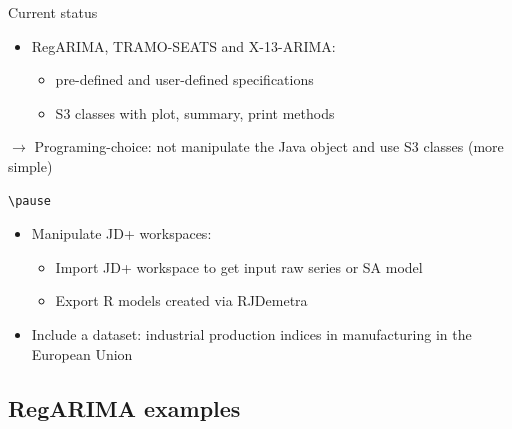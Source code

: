 \documentclass[10pt,xcolor=table,color={dvipsnames,usenames},ignorenonframetext,usepdftitle=false,french]{beamer}
\providecommand{\tightlist}{%
  \setlength{\parskip}{0pt}
  }
\begin{document}
\begin{frame}[fragile]{Current status}
\protect\hypertarget{current-status}{}

\begin{itemize}
\tightlist
\item
  RegARIMA, TRAMO-SEATS and X-13-ARIMA:

  \begin{itemize}
  \tightlist
  \item
    pre-defined and user-defined specifications\\
  \item
    S3 classes with plot, summary, print methods
  \end{itemize}
\end{itemize}

\(\rightarrow\) Programing-choice: not manipulate the Java object and
use S3 classes (more simple)

\begin{verbatim}
\pause
\end{verbatim}

\medskip

\begin{itemize}
\tightlist
\item
  Manipulate JD+ workspaces:

  \begin{itemize}
  \tightlist
  \item
    Import JD+ workspace to get input raw series or SA model
  \item
    Export R models created via RJDemetra
  \end{itemize}
\end{itemize}

\medskip

\begin{itemize}
\tightlist
\item
  Include a dataset: industrial production indices in manufacturing in
  the European Union
\end{itemize}

\end{frame}

\hypertarget{regarima-examples}{%
\subsection{RegARIMA examples}\label{regarima-examples}}
\end{document}
